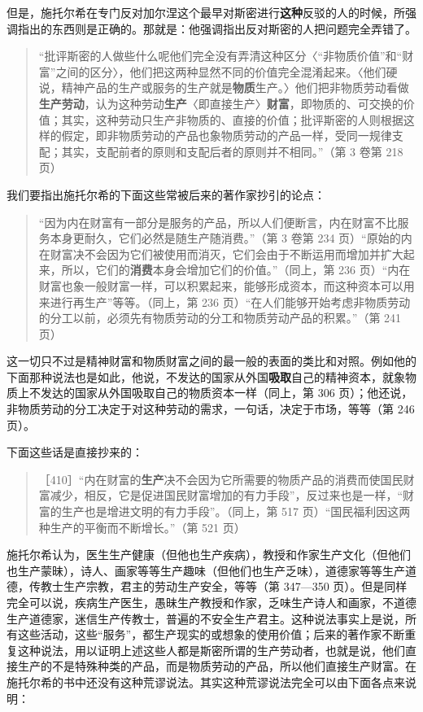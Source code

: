 但是，施托尔希在专门反对加尔涅这个最早对斯密进行\textbf{这种}反驳的人的时候，所强调指出的东西则是正确的。那就是：他强调指出反对斯密的人把问题完全弄错了。

\begin{quote}“批评斯密的人做些什么呢他们完全没有弄清这种区分〈“非物质价值”和“财富”之间的区分〉，他们把这两种显然不同的价值完全混淆起来。〈他们硬说，精神产品的生产或服务的生产就是\textbf{物质}生产。〉他们把非物质劳动看做\textbf{生产劳动}，认为这种劳动\textbf{生产}〈即直接生产〉\textbf{财富}，即物质的、可交换的价值；其实，这种劳动只生产非物质的、直接的价值；批评斯密的人则根据这样的假定，即非物质劳动的产品也象物质劳动的产品一样，受同一规律支配；其实，支配前者的原则和支配后者的原则并不相同。”（第 3 卷第 218 页）\end{quote}

我们要指出施托尔希的下面这些常被后来的著作家抄引的论点：

\begin{quote}“因为内在财富有一部分是服务的产品，所以人们便断言，内在财富不比服务本身更耐久，它们必然是随生产随消费。”（第 3 卷第 234 页）“原始的内在财富决不会因为它们被使用而消灭，它们会由于不断运用而增加并扩大起来，所以，它们的\textbf{消费}本身会增加它们的价值。”（同上，第 236 页）“内在财富也象一般财富一样，可以积累起来，能够形成资本，而这种资本可以用来进行再生产”等等。（同上，第 236 页）“在人们能够开始考虑非物质劳动的分工以前，必须先有物质劳动的分工和物质劳动产品的积累。”（第 241 页）\end{quote}

这一切只不过是精神财富和物质财富之间的最一般的表面的类比和对照。例如他的下面那种说法也是如此，他说，不发达的国家从外国\textbf{吸取}自己的精神资本，就象物质上不发达的国家从外国吸取自己的物质资本一样（同上，第 306 页）；他还说，非物质劳动的分工决定于对这种劳动的需求，一句话，决定于市场，等等（第 246 页）。

下面这些话是直接抄来的：

\begin{quote}［410］“内在财富的\textbf{生产}决不会因为它所需要的物质产品的消费而使国民财富减少，相反，它是促进国民财富增加的有力手段”，反过来也是一样，“财富的生产也是增进文明的有力手段”。（同上，第 517 页）“国民福利因这两种生产的平衡而不断增长。”（第 521 页）\end{quote}

施托尔希认为，医生生产健康（但他也生产疾病），教授和作家生产文化（但他们也生产蒙昧），诗人、画家等等生产趣味（但他们也生产乏味），道德家等等生产道德，传教士生产宗教，君主的劳动生产安全，等等（第 347—350 页）。但是同样完全可以说，疾病生产医生，愚昧生产教授和作家，乏味生产诗人和画家，不道德生产道德家，迷信生产传教士，普遍的不安全生产君主。这种说法事实上是说，所有这些活动，这些“服务”，都生产现实的或想象的使用价值；后来的著作家不断重复这种说法，用以证明上述这些人都是斯密所谓的生产劳动者，也就是说，他们直接生产的不是特殊种类的产品，而是物质劳动的产品，所以他们直接生产财富。在施托尔希的书中还没有这种荒谬说法。其实这种荒谬说法完全可以由下面各点来说明：

